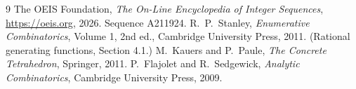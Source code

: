 \documentclass[11pt,a4paper]{article}
\theoremstyle{plain}
\theoremstyle{definition}
\begin{document}
\begin{thebibliography}{9}
 The OEIS Foundation, \emph{The On-Line Encyclopedia of Integer
Sequences}, \url{https://oeis.org}, 2026. Sequence A211924.
 R.~P.~Stanley, \emph{Enumerative Combinatorics}, Volume 1, 2nd ed.,
Cambridge University Press, 2011. (Rational generating functions, Section 4.1.)
 M.~Kauers and P.~Paule, \emph{The Concrete Tetrahedron}, Springer, 2011.
 P.~Flajolet and R.~Sedgewick, \emph{Analytic Combinatorics}, Cambridge
University Press, 2009.
\end{thebibliography}
\end{document}
